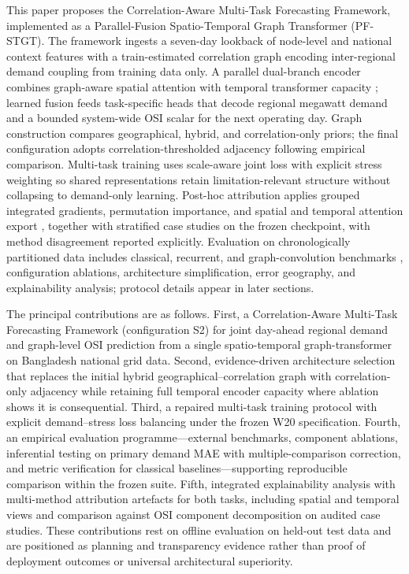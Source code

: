 This paper proposes the Correlation-Aware Multi-Task Forecasting Framework, implemented as a Parallel-Fusion Spatio-Temporal Graph Transformer (PF-STGT). The framework ingests a seven-day lookback of node-level and national context features with a train-estimated correlation graph encoding inter-regional demand coupling from training data only. A parallel dual-branch encoder combines graph-aware spatial attention with temporal transformer capacity \cite{Vaswani2017Attention,Kipf2017GCN}; learned fusion feeds task-specific heads that decode regional megawatt demand and a bounded system-wide OSI scalar for the next operating day. Graph construction compares geographical, hybrid, and correlation-only priors; the final configuration adopts correlation-thresholded adjacency following empirical comparison. Multi-task training uses scale-aware joint loss with explicit stress weighting \cite{Caruana1997Multitask,Song2024MultiTaskEnergy} so shared representations retain limitation-relevant structure without collapsing to demand-only learning. Post-hoc attribution applies grouped integrated gradients, permutation importance, and spatial and temporal attention export \cite{Sundararajan2017IntegratedGradients,Breiman2001RandomForest,Lundberg2017SHAP}, together with stratified case studies on the frozen checkpoint, with method disagreement reported explicitly. Evaluation on chronologically partitioned data includes classical, recurrent, and graph-convolution benchmarks \cite{Breiman2001RandomForest,Hochreiter1997LSTM,Zhao2020TGCN}, configuration ablations, architecture simplification, error geography, and explainability analysis; protocol details appear in later sections.

The principal contributions are as follows. First, a Correlation-Aware Multi-Task Forecasting Framework (configuration S2) for joint day-ahead regional demand and graph-level OSI prediction from a single spatio-temporal graph-transformer on Bangladesh national grid data. Second, evidence-driven architecture selection that replaces the initial hybrid geographical--correlation graph with correlation-only adjacency while retaining full temporal encoder capacity where ablation shows it is consequential. Third, a repaired multi-task training protocol with explicit demand--stress loss balancing under the frozen W20 specification. Fourth, an empirical evaluation programme---external benchmarks, component ablations, inferential testing on primary demand MAE with multiple-comparison correction, and metric verification for classical baselines---supporting reproducible comparison within the frozen suite. Fifth, integrated explainability analysis with multi-method attribution artefacts for both tasks, including spatial and temporal views and comparison against OSI component decomposition on audited case studies. These contributions rest on offline evaluation on held-out test data and are positioned as planning and transparency evidence rather than proof of deployment outcomes or universal architectural superiority.

